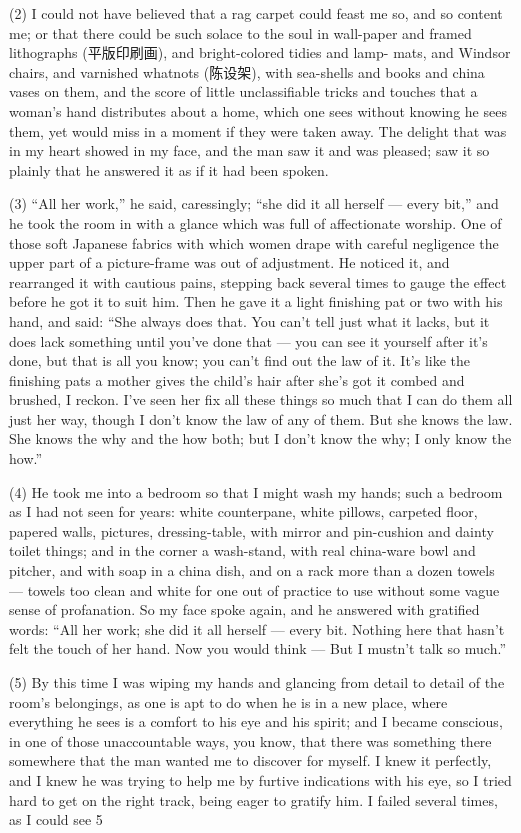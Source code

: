 \documentclass[UTF8,11pt]{ctexart}
\begin{document}
(2) I could not have believed that a rag carpet could feast me so, and so content me; or that there could be such solace to the soul in wall-paper and framed lithographs (平版印刷画), and bright-colored tidies and lamp- mats, and Windsor chairs, and varnished whatnots (陈设架), with sea-shells and books and china vases on them, and the score of little unclassifiable tricks and touches that a woman’s hand distributes about a home, which one sees without knowing he sees them, yet would miss in a moment if they were taken away. The delight that was in my heart showed in my face, and the man saw it and was pleased; saw it so plainly that he answered it as if it had been spoken.


(3) “All her work,” he said, caressingly; “she did it all herself — every bit,” and he took the room in with a glance which was full of affectionate worship. One of those soft Japanese fabrics with which women drape with careful negligence the upper part of a picture-frame was out of adjustment. He noticed it, and rearranged it with cautious pains, stepping back several times to gauge the effect before he got it to suit him. Then he gave it a light finishing pat or two with his hand, and said: “She always does that. You can’t tell just what it lacks, but it does lack something until you’ve done that — you can see it yourself after it’s done, but that is all you know; you can’t find out the law of it. It’s like the finishing pats a mother gives the child’s hair after she’s got it combed and brushed, I reckon. I’ve seen her fix all these things so much that I can do them all just her way, though I don’t know the law of any of them. But she knows the law. She knows the why and the how both; but I don’t know the why; I only know the how.”


(4) He took me into a bedroom so that I might wash my hands; such a bedroom as I had not seen for years: white counterpane, white pillows, carpeted floor, papered walls, pictures, dressing-table, with mirror and pin-cushion and dainty toilet things; and in the corner a wash-stand, with real china-ware bowl and pitcher, and with soap in a china dish, and on a rack more than a dozen towels — towels too clean and white for one out of practice to use without some vague sense of profanation. So my face spoke again, and he answered with gratified words: “All her work; she did it all herself — every bit. Nothing here that hasn’t felt the touch of her hand. Now you would think — But I mustn’t talk so much.”


(5) By this time I was wiping my hands and glancing from detail to detail of the room’s belongings, as one is apt to do when he is in a new place, where everything he sees is a comfort to his eye and his spirit; and I became conscious, in one of those unaccountable ways, you know, that there was something there somewhere that the man wanted me to discover for myself. I knew it perfectly, and I knew he was trying to help me by furtive indications with his eye, so I tried hard to get on the right track, being eager to gratify him. I failed several times, as I could see 5
\end{document}
